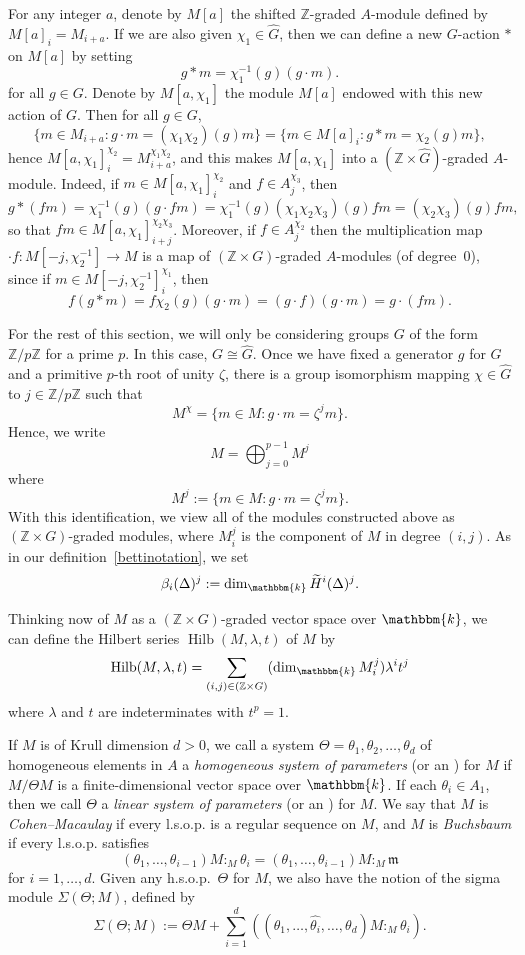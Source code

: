 \documentclass[10pt]{amsart}
\theoremstyle{definition}
\DeclareMathOperator{\Hilb}{Hilb}
\newcommand{\field}{\mathbbm{k}}
\newcommand{\ZZ}{{\mathbb Z}}
\newcommand{\mideal}{\ensuremath{\mathfrak{m}}}
\begin{document}
For any integer $a$, denote by $M[a]$ the shifted $\ZZ$-graded $A$-module defined by $M[a]_i=M_{i+a}$. If we are also given $\chi_1\in\hat{G}$, then we can define a new $G$-action $*$ on $M[a]$ by setting
\[
g*m=\chi_1^{-1}(g) (g\cdot m).
\]
for all $g\in G$. Denote by $M[a, \chi_1]$ the module $M[a]$ endowed with this new action of $G$. Then for all $g\in G$,
\[
\{m\in M_{i+a}:g\cdot m = (\chi_1\chi_2)(g)m\}=\{m\in M[a]_i:g * m = \chi_2(g) m\},
\]
hence $M[a, \chi_1]_i^{\chi_2}=M_{i+a}^{\chi_1\chi_2}$, and this makes $M[a, \chi_1]$ into a $(\ZZ\times \hat{G})$-graded $A$-module. Indeed, if $m\in M[a, \chi_1]_i^{\chi_2}$ and $f\in A_j^{\chi_3}$, then
\[
g*(fm)=\chi_1^{-1}(g)(g\cdot fm)=\chi_1^{-1}(g)(\chi_1\chi_2\chi_3)(g)fm=(\chi_2\chi_3)(g)fm,
\]
so that $fm\in M[a, \chi_1]_{i+j}^{\chi_2\chi_3}$. Moreover, if $f\in A_j^{\chi_2}$ then the multiplication map $\cdot f: M[-j, \chi_2^{-1}]\to M$ is a map of $(\ZZ\times G)$-graded $A$-modules (of degree~$0$), since if $m\in M[-j, \chi_2^{-1}]_i^{\chi_1}$, then
\[
f(g*m)=f\chi_2(g)(g\cdot m)=(g\cdot f)(g\cdot m)=g\cdot(fm).
\]

For the rest of this section, we will only be considering groups $G$ of the form $\ZZ/p\ZZ$ for a prime $p$. In this case, $G\cong\hat{G}$. Once we have fixed a generator $g$ for $G$ and a primitive $p$-th root of unity $\zeta$, there is a group isomorphism mapping $\chi\in \hat{G}$ to $j\in\ZZ/p\ZZ$ such that
\[
M^{\chi}=\{m\in M: g\cdot m = \zeta^jm\}.
\]
Hence, we write
\[
M=\bigoplus_{j=0}^{p-1}M^j
\]
where
\[
M^j:=\{m\in M: g\cdot m = \zeta^jm\}.
\]
With this identification, we view all of the modules constructed above as $(\ZZ\times G)$-graded modules, where $M_i^j$ is the component of $M$ in degree $(i, j)$. As in our definition~\eqref{bettinotation}, we set
\begin{equation}\label{bettiJnotation}
\beta_i(\Delta)^j:=\dim_\field \widetilde{H}^i(\Delta)^j.
\end{equation}

Thinking now of $M$ as a $(\ZZ\times G)$-graded vector space over $\field$, we can define the Hilbert series $\Hilb(M, \lambda, t)$ of $M$ by
\[
\Hilb(M, \lambda, t)=\sum_{(i, j)\in (\ZZ\times G)}(\dim_\field M_i^j)\lambda^it^j
\]
where $\lambda$ and $t$ are indeterminates with $t^p=1$.

If $M$ is of Krull dimension $d>0$, we call a system $\Theta = \theta_1, \theta_2, \ldots, \theta_d$ of homogeneous elements in $A$ a \emph{homogeneous system of parameters} (or an ) for $M$ if $M/\Theta M$ is a finite-dimensional vector space over $\field$. If each $\theta_i\in A_1$, then we call $\Theta$ a \emph{linear system of parameters} (or an ) for $M$. We say that $M$ is \emph{Cohen--Macaulay} if every l.s.o.p. is a regular sequence on $M$, and $M$ is \emph{Buchsbaum} if every l.s.o.p. satisfies
\[
(\theta_1, \ldots, \theta_{i-1})M:_M\theta_i = (\theta_1, \ldots, \theta_{i-1})M:_M\mideal
\]
for $i=1, \ldots, d$. Given any h.s.o.p.~$\Theta$ for $M$, we also have the notion of the sigma module $\Sigma(\Theta; M)$, defined by
\[
\Sigma(\Theta; M):=\Theta M + \sum_{i=1}^d\left((\theta_1, \ldots, \hat{\theta_i}, \ldots, \theta_d)M:_M\theta_i\right).
\]
\end{document}
